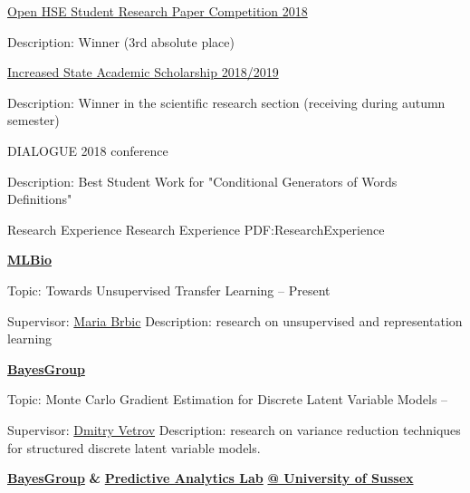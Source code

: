 \documentclass[letterpaper,MMMyyyy,nonstopmode]{simpleresumecv}
\begin{document}
\begin{Body}
\BulletItem
\href{https://nirs.hse.ru/nirs/}{Open HSE Student Research Paper Competition 2018}
\begin{Detail}
\Item
Description: Winner (3rd absolute place)
\end{Detail}

\BulletItem
\href{https://www.hse.ru/en/scholarships/academic_raised_demo}{Increased State Academic Scholarship 2018/2019}
\begin{Detail}
\Item
Description: Winner in the scientific research section (receiving during autumn semester)
\end{Detail}

\BulletItem
DIALOGUE 2018 conference
\begin{Detail}
\Item
Description: Best Student Work for "Conditional Generators of Words Definitions"
\end{Detail}



\Section
{Research Experience}
{Research Experience}
{PDF:ResearchExperience}

\Entry
\href{https://brbiclab.epfl.ch}
{\textbf{MLBio}}

\BulletItem
Topic: Towards Unsupervised Transfer Learning
\hfill
{} --
Present
\begin{Detail}
\SubBulletItem
Supervisor:
\href{https://people.epfl.ch/maria.brbic}{Maria Brbic}
\SubBulletItem
Description: research on unsupervised and representation learning
\end{Detail}

\newpage

\Entry
\href{https://bayesgroup.ru}
{\textbf{BayesGroup}}

\BulletItem
Topic: Monte Carlo Gradient Estimation for Discrete Latent Variable Models
\hfill
{} --
\begin{Detail}
\SubBulletItem
Supervisor:
\href{https://bayesgroup.ru/people/dmitry-vetrov/}{Dmitry Vetrov}
\SubBulletItem
Description: research on variance reduction techniques
\newline
for structured discrete latent variable models.
\end{Detail}

\Entry
\href{https://bayesgroup.ru}
{\textbf{BayesGroup}} \textbf{\&} \href{https://wearepal.ai}{\textbf{Predictive Analytics Lab}} \href{http://sussex.ac.uk}{\textbf{@ University of Sussex}}


\end{Body}
\end{document}
